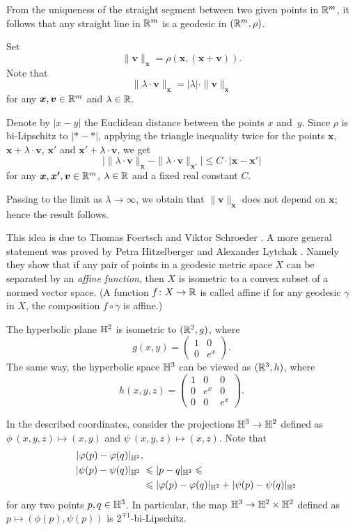 From the uniqueness of the straight segment between two given points in $\mathbb{R}^m$,
it follows that any straight line in $\mathbb{R}^m$ is a geodesic in $(\mathbb{R}^m,\rho)$.

Set 
\[\|\bm{v}\|_{\bm{x}}=\rho(\bm{x},(\bm{x}+\bm{v})).\]
Note that 
\[ \|\lambda\cdot\bm{v}\|_{\bm{x}}
=
|\lambda|\cdot\|\bm{v}\|_{\bm{x}}\]
for any $\bm{x},\bm{v}\in\mathbb{R}^m$ and $\lambda\in\mathbb{R}$.

Denote by $|x-y|$ the Euclidean distance between the points $x$ and~$y$.
Since $\rho$ is bi-Lipschitz to $|{*}-{*}|$,
applying the triangle inequality twice for the points $\bm{x}$, $\bm{x}+\lambda\cdot\bm{v}$, $\bm{x}'$ and $\bm{x}'+\lambda\cdot\bm{v}$, we get
\[
\bigl|\|\lambda\cdot\bm{v}\|_{\bm{x}}
-
\|\lambda\cdot\bm{v}\|_{\bm{x}'}\bigr|
\le 
C\cdot |\bm{x}-\bm{x'}|\]
for any $\bm{x},\bm{x'},\bm{v}\in\mathbb{R}^m$, 
$\lambda\in\mathbb{R}$
and a fixed real constant $C$.

Passing to the limit as $\lambda\to\infty$, 
we obtain that
$\|\bm{v}\|_{\bm{x}}$ does not depend on $\bm{x}$;
hence the result follows.\qeds


This idea is due to Thomas Foertsch
and Viktor Schroeder \cite[see][]{foertsch-schroeder}.
A more general statement was proved by Petra Hitzelberger and Alexander Lytchak \cite[see][]{hitzelberger-lytchak}.
Namely they show that 
if any pair of points in a geodesic metric space $X$ can be separated by an \emph{affine function},
then $X$ is isometric to a convex subset of a normed vector space.
(A function $f\colon X\to\mathbb{R}$ is called affine if for any geodesic $\gamma$ in $X$, the composition $f\circ\gamma$ is affine.)


The hyperbolic plane $\mathbb{H}^2$ is isometric to $(\mathbb{R}^2,g)$, where 
\[g(x,y)=\left(\begin{matrix}
     1&0
     \\
     0&e^{x}
    \end{matrix}\right).\]
The same way, the hyperbolic space $\mathbb{H}^3$
can be viewed as $(\mathbb{R}^3,h)$, where 
\[h(x,y,z)=\left(\begin{matrix}
     1&0&0
     \\
     0&e^{x}&0
     \\
     0&0&e^{x}
\end{matrix}\right).\]
    
In the described coordinates, consider the projections $\mathbb{H}^3\to\mathbb{H}^2$ defined as 
$\phi\:(x,y,z)\mapsto (x,y)$ and $\psi\:(x,y,z)\mapsto (x,z)$.
Note that 
\begin{align*}
|\varphi(p)-\varphi(q)|_{\mathbb{H}^2},&
\\
\quad |\psi(p)-\psi(q)|_{\mathbb{H}^2}\hphantom{,}
&\leqslant
|p-q|_{\mathbb{H}^3}
\leqslant
\\
&\leqslant
|\varphi(p)-\varphi(q)|_{\mathbb{H}^2}+ |\psi(p)-\psi(q)|_{\mathbb{H}^2}
\end{align*}
for any two points $p,q\in \mathbb{H}^3$.
In particular, the map $\mathbb{H}^3\to\mathbb{H}^2\times\mathbb{H}^2$ defined as $p\mapsto (\phi(p),\psi(p))$
is $2^{\mp1}$-bi-Lipschitz.\qeds

